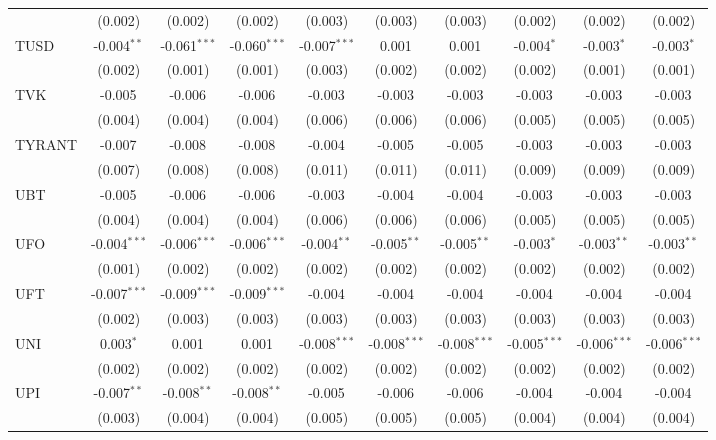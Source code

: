 \begin{table}[!htbp]
\begin{tabular}{@{\extracolsep{5pt}}lccccccccc}
  & (0.002) & (0.002) & (0.002) & (0.003) & (0.003) & (0.003) & (0.002) & (0.002) & (0.002) \\
 TUSD & -0.004$^{**}$ & -0.061$^{***}$ & -0.060$^{***}$ & -0.007$^{***}$ & 0.001$^{}$ & 0.001$^{}$ & -0.004$^{*}$ & -0.003$^{*}$ & -0.003$^{*}$ \\
  & (0.002) & (0.001) & (0.001) & (0.003) & (0.002) & (0.002) & (0.002) & (0.001) & (0.001) \\
 TVK & -0.005$^{}$ & -0.006$^{}$ & -0.006$^{}$ & -0.003$^{}$ & -0.003$^{}$ & -0.003$^{}$ & -0.003$^{}$ & -0.003$^{}$ & -0.003$^{}$ \\
  & (0.004) & (0.004) & (0.004) & (0.006) & (0.006) & (0.006) & (0.005) & (0.005) & (0.005) \\
 TYRANT & -0.007$^{}$ & -0.008$^{}$ & -0.008$^{}$ & -0.004$^{}$ & -0.005$^{}$ & -0.005$^{}$ & -0.003$^{}$ & -0.003$^{}$ & -0.003$^{}$ \\
  & (0.007) & (0.008) & (0.008) & (0.011) & (0.011) & (0.011) & (0.009) & (0.009) & (0.009) \\
 UBT & -0.005$^{}$ & -0.006$^{}$ & -0.006$^{}$ & -0.003$^{}$ & -0.004$^{}$ & -0.004$^{}$ & -0.003$^{}$ & -0.003$^{}$ & -0.003$^{}$ \\
  & (0.004) & (0.004) & (0.004) & (0.006) & (0.006) & (0.006) & (0.005) & (0.005) & (0.005) \\
 UFO & -0.004$^{***}$ & -0.006$^{***}$ & -0.006$^{***}$ & -0.004$^{**}$ & -0.005$^{**}$ & -0.005$^{**}$ & -0.003$^{*}$ & -0.003$^{**}$ & -0.003$^{**}$ \\
  & (0.001) & (0.002) & (0.002) & (0.002) & (0.002) & (0.002) & (0.002) & (0.002) & (0.002) \\
 UFT & -0.007$^{***}$ & -0.009$^{***}$ & -0.009$^{***}$ & -0.004$^{}$ & -0.004$^{}$ & -0.004$^{}$ & -0.004$^{}$ & -0.004$^{}$ & -0.004$^{}$ \\
  & (0.002) & (0.003) & (0.003) & (0.003) & (0.003) & (0.003) & (0.003) & (0.003) & (0.003) \\
 UNI & 0.003$^{*}$ & 0.001$^{}$ & 0.001$^{}$ & -0.008$^{***}$ & -0.008$^{***}$ & -0.008$^{***}$ & -0.005$^{***}$ & -0.006$^{***}$ & -0.006$^{***}$ \\
  & (0.002) & (0.002) & (0.002) & (0.002) & (0.002) & (0.002) & (0.002) & (0.002) & (0.002) \\
 UPI & -0.007$^{**}$ & -0.008$^{**}$ & -0.008$^{**}$ & -0.005$^{}$ & -0.006$^{}$ & -0.006$^{}$ & -0.004$^{}$ & -0.004$^{}$ & -0.004$^{}$ \\
  & (0.003) & (0.004) & (0.004) & (0.005) & (0.005) & (0.005) & (0.004) & (0.004) & (0.004) \\

\end{tabular}
\end{table}
